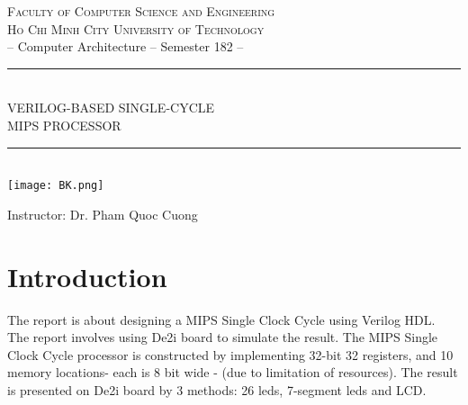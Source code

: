 \documentclass[12pt, a4paper, oneside]{article}
\newcommand{\horrule}[1]{\rule{\linewidth}{#1}} 	%
\begin{document}
    \thispagestyle{empty}
    \begin{titlepage}
        \begin{center}
    	\normalfont \normalsize \textsc{Faculty of Computer Science and Engineering\\Ho Chi Minh City University of Technology}\\ [48pt]
    	{\large -- Computer Architecture -- Semester 182 -- }
        \horrule{0.5pt} \\[0.4cm]
    	\huge VERILOG-BASED SINGLE-CYCLE \\
    	\huge MIPS PROCESSOR
    	\horrule{2pt} \\[0.5cm]
    	
        \texttt{[image: BK.png]} \\
        \vspace{1cm}
    	
        
        {\large Instructor: Dr. Pham Quoc Cuong}
        \end{center}
    \end{titlepage}
    \newpage
    \tableofcontents
    \newpage
    \listoffigures
    \newpage
    \setcounter{page}{1}
    
    \suppressfloats %


    \section{Introduction}
 \hspace{0.5cm} The report is about designing a MIPS Single Clock Cycle using Verilog HDL. The report involves using De2i board to simulate the result. The MIPS Single Clock Cycle processor is constructed by implementing 32-bit 32 registers, and 10 memory locations- each is 8 bit wide - (due to limitation of resources). The result is presented on De2i board by 3 methods: 26 leds, 7-segment leds and LCD.
\end{document}
